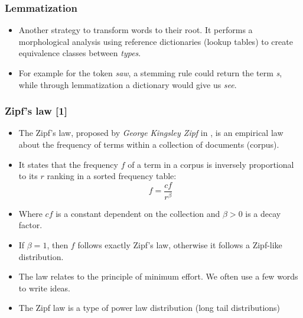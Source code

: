 \documentclass[handout]{beamer}
\begin{document}
\begin{frame}\frametitle{Lemmatization}
\footnotesize{

\begin{itemize}
 \item Another strategy to transform words to their root. It performs a morphological analysis using reference dictionaries (lookup tables) to create equivalence classes between \emph{types}.
\item For example for the token \emph{saw}, a stemming rule could return the term \emph{s}, while through lemmatization a dictionary would give us \emph{see}. 

\end{itemize}





}
\end{frame}



\begin{frame}\frametitle{Zipf's law [1]}
\footnotesize{
\begin{itemize}
\item The Zipf's law, proposed by \emph{George Kingsley Zipf} in \cite{zipf1935}, is an empirical law about the frequency of terms within a collection of documents (corpus). 
\item It states that the frequency $f$ of a term in a corpus is inversely proportional to its $r$ ranking in a sorted frequency table:
\begin{equation}
	f = \frac{cf}{r^{\beta}}
\end{equation}
\item Where $cf$ is a constant dependent on the collection and $\beta > 0$ is a decay factor.
\item If $\beta = 1$, then $f$ follows exactly Zipf's law, otherwise it follows a Zipf-like distribution. 

\item The law relates to the principle of minimum effort. We often use a few words to write ideas.

\item The Zipf law is a type of power law distribution (long tail distributions)


\end{itemize}


}
 
\end{frame}
\end{document}
